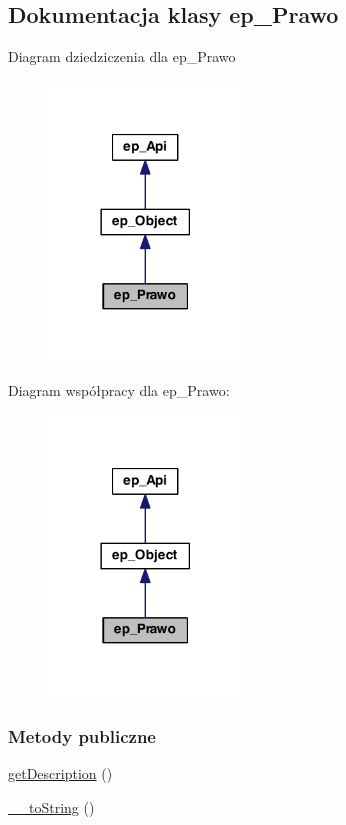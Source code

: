 \hypertarget{classep___prawo}{\subsection{Dokumentacja klasy ep\-\_\-\-Prawo}
\label{classep___prawo}
}


Diagram dziedziczenia dla ep\-\_\-\-Prawo\nopagebreak
\begin{figure}[H]
\begin{center}
\leavevmode
\includegraphics[width=146pt]{classep___prawo__inherit__graph}
\end{center}
\end{figure}


Diagram współpracy dla ep\-\_\-\-Prawo\-:\nopagebreak
\begin{figure}[H]
\begin{center}
\leavevmode
\includegraphics[width=146pt]{classep___prawo__coll__graph}
\end{center}
\end{figure}
\subsubsection*{Metody publiczne}
\begin{DoxyCompactItemize}
\item 
\hyperlink{classep___prawo_a2e7bb35c71bf1824456ceb944cb7a845}{get\-Description} ()
\item 
\hyperlink{classep___prawo_a7516ca30af0db3cdbf9a7739b48ce91d}{\-\_\-\-\_\-to\-String} ()
\end{DoxyCompactItemize}
